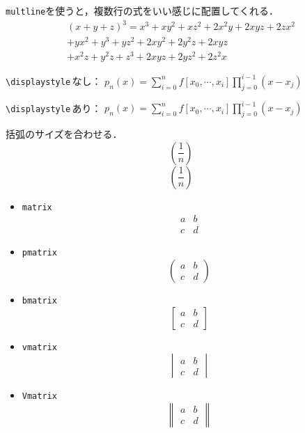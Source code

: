 \documentclass[11pt]{ltjsarticle}
\begin{document}
\verb|multline|を使うと，複数行の式をいい感じに配置してくれる．
\begin{multline}
(x+y+z)^3=x^3+xy^2+xz^2+2x^2y+2xyz+2zx^2\\
+yx^2+y^3+yz^2+2xy^2+2y^2z+2xyz\\
+x^2z+y^2z+z^3+2xyz+2yz^2+2z^2x
\end{multline}

\verb|\displaystyle|\,なし：
$p_n(x) =\sum_{i=0}^n f[x_0,\cdots,x_i] \prod_{j=0}^{i-1}(x-x_j)$

\verb|\displaystyle|\,あり：
$\displaystyle p_n(x) =\sum_{i=0}^n f[x_0,\cdots,x_i] \prod_{j=0}^{i-1}(x-x_j)$

括弧のサイズを合わせる．
\begin{equation}
    (\frac{1}{n})
\end{equation}
\begin{equation}
    \left(\frac{1}{n}\right)
\end{equation}

\begin{itemize}
    \item \verb|matrix|
    \begin{equation}
    \begin{matrix}
        a & b \\
        c & d 
    \end{matrix}
    \end{equation}
    \item \verb|pmatrix|
    \begin{equation}
    \begin{pmatrix}
        a & b \\
        c & d 
    \end{pmatrix}
    \end{equation}
    \item \verb|bmatrix|
    \begin{equation}
    \begin{bmatrix}
        a & b \\
        c & d 
    \end{bmatrix}
    \end{equation}
    \item \verb|vmatrix|
    \begin{equation}
    \begin{vmatrix}
        a & b \\
        c & d 
    \end{vmatrix}
    \end{equation}
    \item \verb|Vmatrix|
    \begin{equation}
    \begin{Vmatrix}
        a & b \\
        c & d 
    \end{Vmatrix}
    \end{equation}
\end{itemize}
\end{document}
